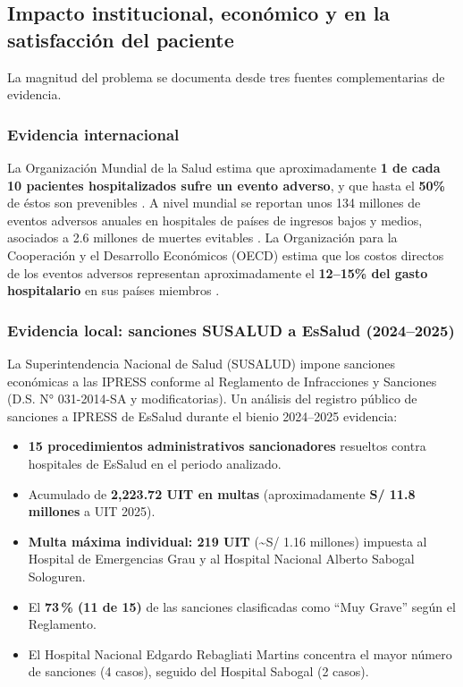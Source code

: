 \subsection{Impacto institucional, económico y en la satisfacción del paciente}

La magnitud del problema se documenta desde tres fuentes complementarias de evidencia.

\subsubsection*{Evidencia internacional}
La Organización Mundial de la Salud estima que aproximadamente \textbf{1 de cada 10 pacientes hospitalizados sufre un evento adverso}, y que hasta el \textbf{50\%} de éstos son prevenibles \citep{who2019}. A nivel mundial se reportan unos 134 millones de eventos adversos anuales en hospitales de países de ingresos bajos y medios, asociados a 2.6 millones de muertes evitables \citep{slawomirski2017}. La Organización para la Cooperación y el Desarrollo Económicos (OECD) estima que los costos directos de los eventos adversos representan aproximadamente el \textbf{12--15\% del gasto hospitalario} en sus países miembros \citep{oecd2017economics}.

\subsubsection*{Evidencia local: sanciones SUSALUD a EsSalud (2024--2025)}
La Superintendencia Nacional de Salud (SUSALUD) impone sanciones económicas a las IPRESS conforme al Reglamento de Infracciones y Sanciones (D.S. N° 031-2014-SA y modificatorias). Un análisis del registro público de sanciones a IPRESS de EsSalud durante el bienio 2024--2025 \citep{susalud2024multas} evidencia:

\begin{itemize}
    \item \textbf{15 procedimientos administrativos sancionadores} resueltos contra hospitales de EsSalud en el periodo analizado.
    \item Acumulado de \textbf{2{,}223.72 UIT en multas} (aproximadamente \textbf{S/ 11.8 millones} a UIT 2025).
    \item \textbf{Multa máxima individual: 219 UIT} (\textasciitilde S/ 1.16 millones) impuesta al Hospital de Emergencias Grau y al Hospital Nacional Alberto Sabogal Sologuren.
    \item El \textbf{73\,\% (11 de 15)} de las sanciones clasificadas como ``Muy Grave'' según el Reglamento.
    \item El Hospital Nacional Edgardo Rebagliati Martins concentra el mayor número de sanciones (4 casos), seguido del Hospital Sabogal (2 casos).
\end{itemize}

